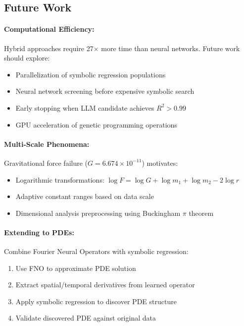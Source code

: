 
\subsection{Future Work}

\paragraph{Computational Efficiency:} Hybrid approaches require 27$\times$ more time than neural networks. Future work should explore:
\begin{itemize}
\item Parallelization of symbolic regression populations
\item Neural network screening before expensive symbolic search
\item Early stopping when LLM candidate achieves $R^2 > 0.99$
\item GPU acceleration of genetic programming operations
\end{itemize}

\paragraph{Multi-Scale Phenomena:} Gravitational force failure ($G = 6.674 \times 10^{-11}$) motivates:
\begin{itemize}
\item Logarithmic transformations: $\log F = \log G + \log m_1 + \log m_2 - 2\log r$
\item Adaptive constant ranges based on data scale
\item Dimensional analysis preprocessing using Buckingham $\pi$ theorem
\end{itemize}

\paragraph{Extending to PDEs:} Combine Fourier Neural Operators with symbolic regression:
\begin{enumerate}
\item Use FNO to approximate PDE solution
\item Extract spatial/temporal derivatives from learned operator
\item Apply symbolic regression to discover PDE structure
\item Validate discovered PDE against original data
\end{enumerate}


